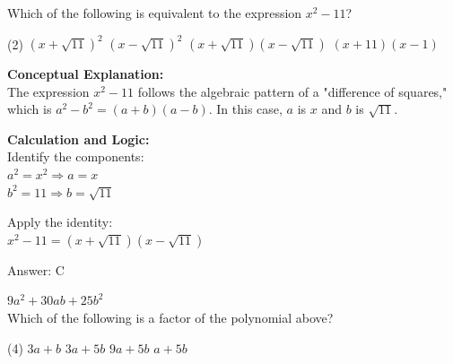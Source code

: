 \documentclass[11pt,paper=a4,answers]{exam}
\begin{document}
\begin{questions}
\pointsinrightmargin
\pointsdroppedatright
\marksnotpoints
{}
\pointformat{\boldmath\themarginpoints}
\bracketedpoints




\question
Which of the following is equivalent to the expression $x^2 - 11$?
\begin{tasks}(2)
    \task $(x + \sqrt{11})^2$
    \task $(x - \sqrt{11})^2$
    \task $(x + \sqrt{11})(x - \sqrt{11})$
    \task $(x + 11)(x - 1)$
\end{tasks}

\begin{solution}
\textbf{Conceptual Explanation:} \\
The expression $x^2 - 11$ follows the algebraic pattern of a "difference of squares," which is $a^2 - b^2 = (a + b)(a - b)$. In this case, $a$ is $x$ and $b$ is $\sqrt{11}$.

\vspace{20pt}

\textbf{Calculation and Logic:} \\
Identify the components: \\
$a^2 = x^2 \Rightarrow a = x$ \\
$b^2 = 11 \Rightarrow b = \sqrt{11}$

\vspace{10pt}

Apply the identity: \\
$x^2 - 11 = (x + \sqrt{11})(x - \sqrt{11})$

\vspace{25pt}

Answer: \colorbox{yellow!100}{C}
\end{solution}

\vspace{40pt}

\question
$9a^2 + 30ab + 25b^2$ \\
Which of the following is a factor of the polynomial above?
\begin{tasks}(4)
    \task $3a + b$
    \task $3a + 5b$
    \task $9a + 5b$
    \task $a + 5b$
\end{tasks}


\end{questions}
\end{document}

